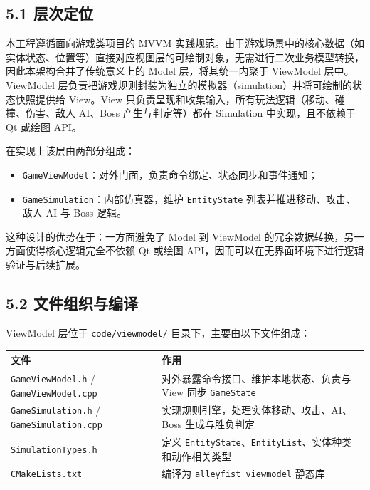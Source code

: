 \documentclass[12pt,fontset=none]{ctexart}
\begin{document}

\subsection{5.1 层次定位}

本工程遵循面向游戏类项目的 MVVM 实践规范。由于游戏场景中的核心数据（如实体状态、位置等）直接对应视图层的可绘制对象，无需进行二次业务模型转换，因此本架构合并了传统意义上的 Model 层，将其统一内聚于 ViewModel 层中。ViewModel 层负责把游戏规则封装为独立的模拟器（simulation）并将可绘制的状态快照提供给 View。View 只负责呈现和收集输入，所有玩法逻辑（移动、碰撞、伤害、敌人 AI、Boss 产生与判定等）都在 Simulation 中实现，且不依赖于 Qt 或绘图 API。

在实现上该层由两部分组成：

\begin{itemize}
\item \texttt{GameViewModel}：对外门面，负责命令绑定、状态同步和事件通知；
\item \texttt{GameSimulation}：内部仿真器，维护 \texttt{EntityState} 列表并推进移动、攻击、敌人 AI 与 Boss 逻辑。
\end{itemize}

这种设计的优势在于：一方面避免了 Model 到 ViewModel 的冗余数据转换，另一方面使得核心逻辑完全不依赖 Qt 或绘图 API，因而可以在无界面环境下进行逻辑验证与后续扩展。

\subsection{5.2 文件组织与编译}

ViewModel 层位于 \texttt{code/viewmodel/} 目录下，主要由以下文件组成：

\begin{longtable}{l l}
\toprule
\textbf{文件} & \textbf{作用} \\
\midrule
\endhead
\texttt{GameViewModel.h} / \texttt{GameViewModel.cpp} & 对外暴露命令接口、维护本地状态、负责与 View 同步 \texttt{GameState} \\
\texttt{GameSimulation.h} / \texttt{GameSimulation.cpp} & 实现规则引擎，处理实体移动、攻击、AI、Boss 生成与胜负判定 \\
\texttt{SimulationTypes.h} & 定义 \texttt{EntityState}、\texttt{EntityList}、实体种类和动作相关类型 \\
\texttt{CMakeLists.txt} & 编译为 \texttt{alleyfist\_viewmodel} 静态库 \\
\bottomrule
\end{longtable}
\end{document}
